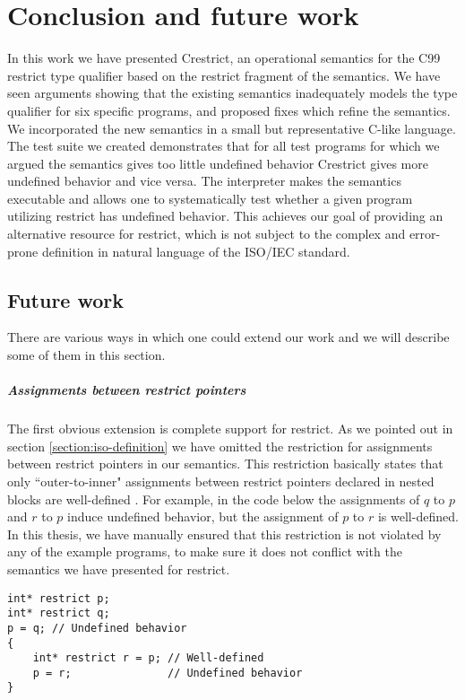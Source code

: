 \chapter{Conclusion and future work}\label{chap:conclusion}
In this work we have presented Crestrict, an operational semantics for the C99 restrict type qualifier
based on the restrict fragment of the \cink{} semantics.
We have seen arguments showing that the existing semantics inadequately models the type qualifier for six specific programs,
and proposed fixes which refine the semantics.
We incorporated the new semantics in a small but representative C-like language.
The test suite we created demonstrates that for all test programs for which we argued the \cink{} semantics gives too little undefined behavior
Crestrict gives more undefined behavior and vice versa. 
The interpreter makes the semantics executable and allows one to systematically test whether a given program utilizing restrict has undefined behavior.
This achieves our goal of providing an alternative resource for restrict, which is not subject to the complex and error-prone definition in natural language of the ISO/IEC standard.

\section{Future work}
There are various ways in which one could extend our work and we will describe some of them in this section.

\paragraph{Assignments between restrict pointers}
The first obvious extension is complete support for restrict.
As we pointed out in section \ref{section:iso-definition}
we have omitted the restriction for assignments between restrict pointers in our semantics.
This restriction basically states that only ``outer-to-inner" assignments 
between restrict pointers declared in nested blocks are well-defined \cite[6.7.3.1, p4]{ISO:2018:III}.
For example, in the code below the assignments of $q$ to $p$
and $r$ to $p$ induce undefined behavior, but the assignment of $p$ to $r$ is well-defined.
In this thesis, we have manually ensured that this restriction is not violated by
any of the example programs, to make sure it does not conflict with the semantics we have presented for restrict.

\begin{code}
\begin{verbatim}
int* restrict p;
int* restrict q;
p = q; // Undefined behavior
{
    int* restrict r = p; // Well-defined
    p = r;               // Undefined behavior
}
\end{verbatim}
\end{code}

